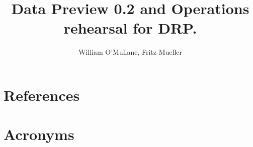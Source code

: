 \documentclass[OPS,authoryear,toc]{lsstdoc}
\title{Data Preview 0.2 and Operations rehearsal for DRP.}
\author{%
  William O'Mullane,
  Fritz Mueller
}
\date{\vcsDate}
\begin{document}
\maketitle




\appendix

\section{References}\label{sec:bib}
\renewcommand{\refname}{} %


\section{Acronyms}\label{sec:acronyms}

\end{document}

